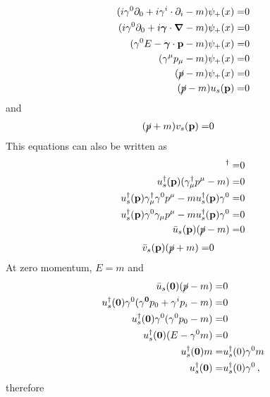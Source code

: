 \begin{align}
  \label{eq:144}
  (i\gamma^0\partial_0+i {\gamma}^i\cdot\partial_i-m)\psi_+(x)=&0\nonumber\\
  (i\gamma^0\partial_0+i \boldsymbol{\gamma}\cdot\boldsymbol{\nabla}-m)\psi_+(x)=&0\nonumber\\
  (\gamma^0E- \boldsymbol{\gamma}\cdot\mathbf{p}-m)\psi_+(x)=&0\nonumber\\
  (\gamma^\mu p_\mu-m)\psi_+(x)=&0\nonumber\\
  (\cancel{p}-m)\psi_+(x)=&0\nonumber\\
  (\cancel{p}-m)u_s(\mathbf{p})=&0
\end{align}
and
\begin{align}
  \label{eq:142}
   (\cancel{p}+m)v_s(\mathbf{p})=&0
\end{align}
This equations can also be written as
\begin{align}
   [(\cancel{p}-m)u_s(\mathbf{p})]^\dagger=&0\nonumber\\
   u_s^\dagger(\mathbf{p})(\gamma_\mu^\dagger p^\mu-m)=&0\nonumber\\
   u_s^\dagger(\mathbf{p})\gamma_\mu^\dagger\gamma^0p^\mu-m u_s^\dagger(\mathbf{p})\gamma^0=&0\nonumber\\
   u_s^\dagger(\mathbf{p})\gamma^0\gamma_\mu p^\mu-m u_s^\dagger(\mathbf{p})\gamma^0=&0\nonumber\\
   \bar{u}_s(\mathbf{p})(\cancel{p}-m)=&0
\end{align}
\begin{align}
\label{eq:143}
     \bar{v}_s(\mathbf{p})(\cancel{p}+m)=&0
\end{align}
At zero momentum, $E=m$ and
\begin{align*}
  \bar{u}_s(\mathbf{0})(\cancel{p}-m)=&0\nonumber\\
    {u}_s^\dagger(\mathbf{0}) \gamma^0(\gamma^\mathbf{0}p_0+\gamma^i{p_i}-m)=&0\nonumber\\
    {u}_s^\dagger(\mathbf{0}) \gamma^0(\gamma^0p_0-m)=&0\nonumber\\
    {u}_s^\dagger(\mathbf{0}) (E-\gamma^0 m)=&0\nonumber\\
    {u}_s^\dagger(\mathbf{0})m =&{u}_s^\dagger(0)\gamma^0 m\nonumber\\
    {u}_s^\dagger(\mathbf{0}) =&{u}_s^\dagger(0)\gamma^0\,,
\end{align*}
therefore

